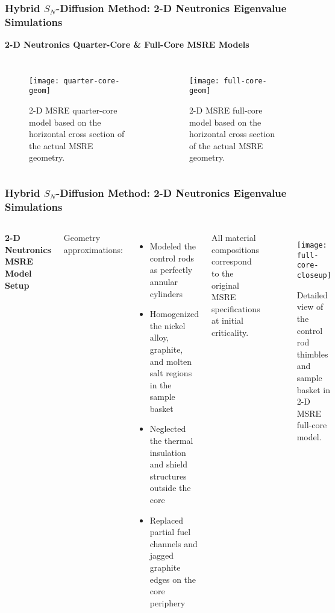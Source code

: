\begin{frame}
  \frametitle{Hybrid $S_N$-Diffusion Method: 2-D Neutronics Eigenvalue Simulations}
  \textbf{2-D Neutronics Quarter-Core \& Full-Core MSRE Models}
  \begin{columns}
    \column{5.5cm}
  \begin{figure}[htb!]
    \centering
    \texttt{[image: quarter-core-geom]}
    \caption{2-D \gls{MSRE} quarter-core model based on the horizontal cross section of the actual
    \gls{MSRE} geometry.}
    \label{fig:1/4-geom}
  \end{figure}
  \column{5.5cm}
  \begin{figure}[htb!]
    \centering
    \texttt{[image: full-core-geom]}
    \caption{2-D \gls{MSRE} full-core model based on the horizontal cross section of the actual
    \gls{MSRE} geometry.}
    \label{fig:full-geom}
  \end{figure}
\end{columns}
\end{frame}

\begin{frame}
  \frametitle{Hybrid $S_N$-Diffusion Method: 2-D Neutronics Eigenvalue Simulations}
  \begin{columns}
    \column{6.5cm}
    \textbf{2-D Neutronics MSRE Model Setup}
    \vspace{.2cm}

    Geometry approximations:
    \begin{itemize}
      \item Modeled the control rods as perfectly annular cylinders
      \item Homogenized the nickel alloy, graphite, and molten salt regions in the sample basket
      \item Neglected the thermal insulation and shield structures outside the core
      \item Replaced partial fuel channels and jagged graphite edges on the core periphery
    \end{itemize}
    All material compositions correspond to the original MSRE specifications at initial criticality.
    \column{4.5cm}
    \begin{figure}[htb!]
      \centering
      \texttt{[image: full-core-closeup]}
      \caption{Detailed view of the control rod thimbles and sample basket in 2-D \gls{MSRE} full-core
        model.}
      \label{fig:full-geom-closeup}
    \end{figure}
  \end{columns}
\end{frame}

